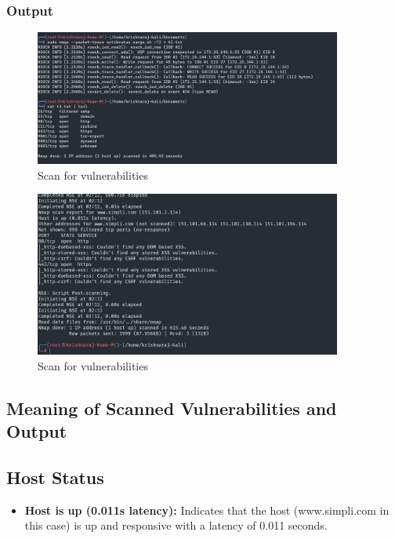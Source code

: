 \documentclass[11pt]{article}
\begin{document}
\subsubsection*{Output}
\begin{figure}[H]
    \centering
    \includegraphics[width=0.9\textwidth]{vuln.png}
    \caption{Scan for vulnerabilities}
    \label{fig:1}
\end{figure}
\begin{figure}[H]
    \centering
    \includegraphics[width=0.9\textwidth]{vuln 2.png}
    \caption{Scan for vulnerabilities}
    \label{fig:1}
\end{figure}


\subsection*{Meaning of Scanned Vulnerabilities and Output}
\subsection*{Host Status}
\begin{itemize}
    \item \textbf{Host is up (0.011s latency):} Indicates that the host (www.simpli.com in this case) is up and responsive with a latency of 0.011 seconds.
\end{itemize}
\end{document}
